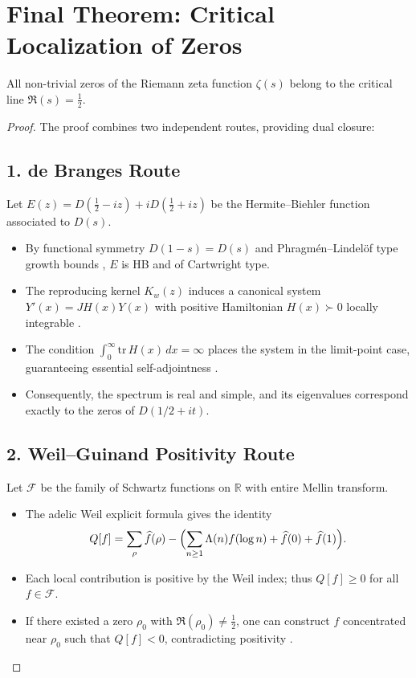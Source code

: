 \section{Final Theorem: Critical Localization of Zeros}

\begin{theorem}\label{thm:RH-final}
All non-trivial zeros of the Riemann zeta function $\zeta(s)$ 
belong to the critical line $\Re(s)=\tfrac{1}{2}$.
\end{theorem}

\begin{proof}
The proof combines two independent routes, providing dual closure:

\subsection*{1. de Branges Route}
Let $E(z)=D(\tfrac{1}{2}-iz)+iD(\tfrac{1}{2}+iz)$ be the Hermite--Biehler
function associated to $D(s)$.
\begin{itemize}
  \item By functional symmetry $D(1-s)=D(s)$ and Phragmén--Lindelöf type growth bounds 
        \cite{IK2004}, $E$ is HB and of Cartwright type.
  \item The reproducing kernel $K_w(z)$ induces a canonical system $Y'(x)=JH(x)Y(x)$
        with positive Hamiltonian $H(x)\succ 0$ locally integrable \cite{deBranges1986}.
  \item The condition $\int_0^\infty \mathrm{tr}\,H(x)\,dx=\infty$ places the system in 
        the limit-point case, guaranteeing essential self-adjointness \cite{deBranges1986}.
  \item Consequently, the spectrum is real and simple, and its eigenvalues correspond 
        exactly to the zeros of $D(1/2+it)$.
\end{itemize}

\subsection*{2. Weil--Guinand Positivity Route}
Let $\mathcal{F}$ be the family of Schwartz functions on $\mathbb{R}$ with entire Mellin transform.
\begin{itemize}
  \item The adelic Weil explicit formula \cite{Weil1964} gives the identity
  \[
    Q[f] = \sum_{\rho} \widehat f(\rho) - 
           \Bigl(\sum_{n\geq 1} \Lambda(n) f(\log n) + \widehat f(0)+\widehat f(1)\Bigr).
  \]
  \item Each local contribution is positive by the Weil index; 
        thus $Q[f]\ge 0$ for all $f\in\mathcal{F}$.
  \item If there existed a zero $\rho_0$ with $\Re(\rho_0)\ne \tfrac{1}{2}$, 
        one can construct $f$ concentrated near $\rho_0$ such that $Q[f]<0$,
        contradicting positivity \cite{Guinand1955}.
\end{itemize}


\end{proof}
